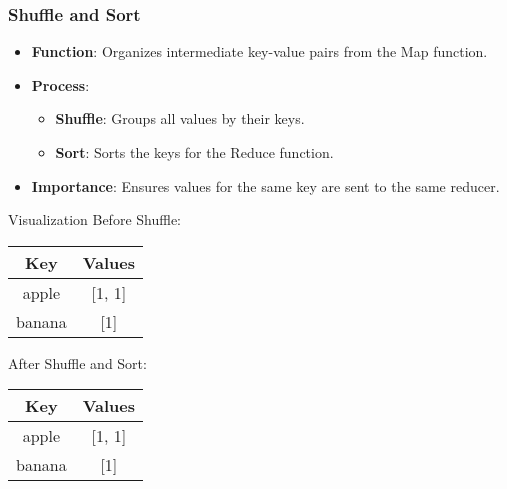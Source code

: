 \documentclass[aspectratio=169]{beamer}
\begin{document}
\begin{frame}
    \frametitle{Shuffle and Sort}
    \begin{itemize}
        \item \textbf{Function}: Organizes intermediate key-value pairs from the Map function.
        \item \textbf{Process}:
        \begin{itemize}
            \item \textbf{Shuffle}: Groups all values by their keys.
            \item \textbf{Sort}: Sorts the keys for the Reduce function.
        \end{itemize}
        \item \textbf{Importance}: Ensures values for the same key are sent to the same reducer.
    \end{itemize}

    \begin{block}{Visualization}
        Before Shuffle: \\
        \begin{tabular}{|c|c|}
            \hline
            Key & Values \\
            \hline
            apple & [1, 1] \\
            banana & [1] \\
            \hline
        \end{tabular}
        
        After Shuffle and Sort: \\
        \begin{tabular}{|c|c|}
            \hline
            Key & Values \\
            \hline
            apple & [1, 1] \\
            banana & [1] \\
            \hline
        \end{tabular}
    \end{block}
\end{frame}
\end{document}
